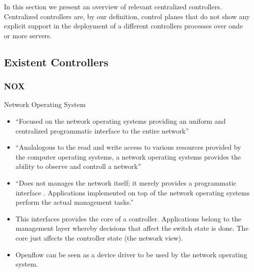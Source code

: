 \begin{itemize}
In this section we present an overview of relevant centralized
controllers. Centralized controllers are, by our definition, control
planes that do not show any explicit support in the deployment of a
different controllers processes over onde or more servers. 
\subsection{Existent Controllers}
\subsubsection{NOX}
\label{sec:nox}


Network Operating System
\begin{itemize}
\item ``Focused on the network operating systems providing an uniform and centralized programmatic interface to the entire network''
\item ``Analalogous to the read and write access to various resources provided by the computer operating systems, a network operating systems provides the ability to observe and controll a network''
\item ``Does not manages the network itself; it merely provides a programmatic interface . Applications implemented on top of the network operating systems perform the actual management tasks.''
\item This interfaces provides the core of a controller. Applications belong to the management layer whereby decisions that affect the switch state is done. The core just affects the controller state (the network view). 
\item Openflow can be seen as a device driver to be used by the network operating system. 
\end{itemize}


\end{itemize}
